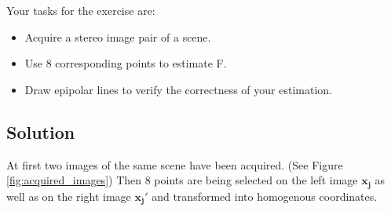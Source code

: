 \documentclass[
a4paper,     %
11pt         %
]{scrartcl}  %
\begin{document}
Your tasks for the exercise are:
\begin{itemize}
    \item Acquire a stereo image pair of a scene.
    \item Use 8 corresponding points to estimate F.
    \item Draw epipolar lines to verify the correctness of your estimation.
\end{itemize}

\subsection{Solution}

At first two images of the same scene have been acquired. (See Figure \ref{fig:acquired_images})
Then $8$ points are being selected on the left image $\mathbf{x_j}$ as well as on the right image $\mathbf{x_j'}$ and transformed into homogenous coordinates.
\end{document}

